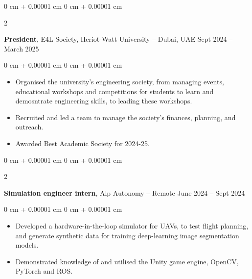 \documentclass[10pt, letterpaper]{article}
\newenvironment{highlights}{
    \begin{itemize}[
        topsep=0.10 cm,
        parsep=0.10 cm,
        partopsep=0pt,
        itemsep=0pt,
        leftmargin=0 cm + 10pt
    ]
}{
    \end{itemize}
} %
\newenvironment{onecolentry}{
    \begin{adjustwidth}{
        0 cm + 0.00001 cm
    }{
        0 cm + 0.00001 cm
    }
}{
    \end{adjustwidth}
} %
\newenvironment{twocolentry}[2][]{
    \onecolentry
    \def\secondColumn{#2}
    \setcolumnwidth{\fill, 4.5 cm}
    \begin{paracol}{2}
}{
    \switchcolumn \raggedleft \secondColumn
    \end{paracol}
    \endonecolentry
} %
\begin{document}
        \vspace{0.2 cm}
        \begin{twocolentry}{
            Sept 2024 – March 2025
        }
            \textbf{President}, E4L Society, Heriot-Watt University -- Dubai, UAE\end{twocolentry}

        \vspace{0.10 cm}
        \begin{onecolentry}
            \begin{highlights}
                \item Organised the university’s engineering society, from managing events, educational workshops and competitions for students to learn and demosntrate engineering skills, to leading these workshops. 
                \item Recruited and led a team to manage the society's finances, planning, and outreach.
                \item Awarded Best Academic Society for 2024-25. 
            \end{highlights}
        \end{onecolentry}

        \vspace{0.2 cm}

        \begin{twocolentry}{
            June 2024 – Sept 2024
        }
            \textbf{Simulation engineer intern}, Alp Autonomy -- Remote\end{twocolentry}

        \vspace{0.10 cm}
        \begin{onecolentry}
            \begin{highlights}
                \item Developed a hardware-in-the-loop simulator for UAVs, to test flight planning, and generate synthetic data for training deep-learning image segmentation models.
                \item Demonstrated knowledge of and utilised the Unity game engine, OpenCV, PyTorch and ROS.
            \end{highlights}
        \end{onecolentry}
\end{document}
